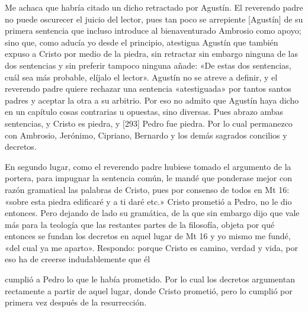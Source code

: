 Me achaca que habría citado un dicho retractado por Agustín. El reverendo padre no puede oscurecer el juicio del lector, pues tan poco se arrepiente [Agustín] de su primera sentencia que incluso introduce al bienaventurado Ambrosio como apoyo; sino que, como aducía yo desde el principio, atestigua Agustín que también expuso a Cristo por medio de la piedra, sin retractar sin embargo ninguna de las dos sentencias y sin preferir tampoco ninguna añade: «De estas dos sentencias, cuál sea más probable, elíjalo el lector». Agustín no se atreve a definir, y el reverendo padre quiere rechazar una sentencia «atestiguada» por tantos santos padres y aceptar la otra a su arbitrio. Por eso no admito que Agustín haya dicho en un capítulo cosas contrarias u opuestas, sino diversas. Pues abrazo ambas sentencias, y Cristo es piedra, y [293] Pedro fue piedra. Por lo cual permanezco con Ambrosio, Jerónimo, Cipriano, Bernardo y los demás sagrados concilios y decretos.

En segundo lugar, como el reverendo padre hubiese tomado el argumento de la portera, para impugnar la sentencia común, le mandé que ponderase mejor con razón gramatical las palabras de Cristo, pues por consenso de todos en Mt 16: «sobre esta piedra edificaré y a ti daré etc.» Cristo prometió a Pedro, no le dio entonces. Pero dejando de lado su gramática, de la que sin embargo dijo que vale más para la teología que las restantes partes de la filosofía, objeta por qué entonces se fundan los decretos en aquel lugar de Mt 16 y yo mismo me fundé, «del cual ya me aparto». Respondo: porque Cristo es camino, verdad y vida, por eso ha de creerse indudablemente que él

cumplió a Pedro lo que le había prometido. Por lo cual los decretos argumentan rectamente a partir de aquel lugar, donde Cristo prometió, pero lo cumplió por primera vez después de la resurrección.

